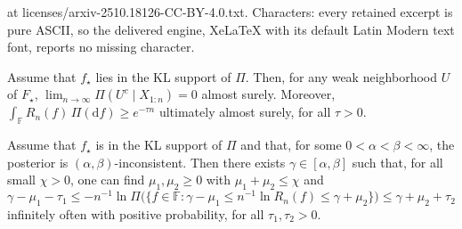 \documentclass[10pt,a4paper]{amsart}
\def\FF{\mathbb{F}}
\begin{document}
at licenses/arxiv-2510.18126-CC-BY-4.0.txt. Characters: every retained excerpt is pure ASCII, so the delivered engine, XeLaTeX with its default Latin Modern text font, reports no missing character.
\begin{lemma}\label{lem:schwartz}
    Assume that $f_\star$ lies in the KL support of $\Pi$. Then, for any weak neighborhood $U$ of $F_\star$, $\lim_{n\to\infty} \Pi(U^c \mid X_{1:n}) = 0$ almost surely. Moreover, $\int_\FF R_n(f)\,\Pi(\mathrm df) \geq e^{-\tau n}$ ultimately almost surely, for all $\tau > 0$.
\end{lemma}

\begin{theorem}\label{thm:alpha_beta_inconsistency}
    Assume that $f_\star$ is in the KL support of $\Pi$ and that, for some $0<\alpha < \beta<\infty$, the posterior is $(\alpha,\beta)$-inconsistent. Then there exists $\gamma\in[\alpha,\beta]$ such that, for all small $\chi>0$, one can find $\mu_1,\mu_2\geq 0$ with $\mu_1+\mu_2\leq \chi$ and
    \begin{equation}\label{eq:theorem_alpha_beta_inconsistency}
        \gamma - \mu_1 - \tau_1 \leq -n^{-1}\ln\Pi\big(\big\{f\in\FF : \gamma-\mu_1 \leq n^{-1}\ln R_n(f)\leq \gamma + \mu_2\big\}\big) \leq \gamma + \mu_2 + \tau_2
    \end{equation}
    infinitely often with positive probability, for all $\tau_1,\tau_2>0$.
\end{theorem}
\end{document}
